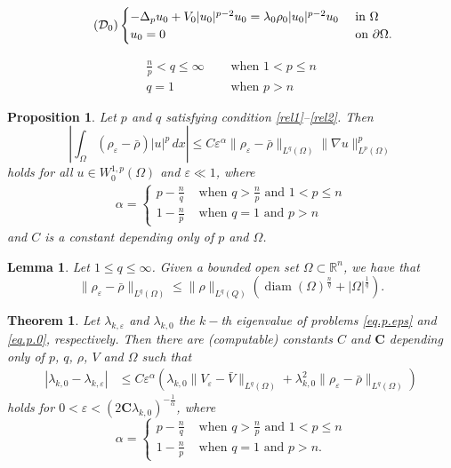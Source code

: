 \documentclass[10pt,a4paper]{amsart}
\newtheorem{prop}{Proposition}
\newtheorem{lema}{Lemma}
\newtheorem{thm}{Theorem}
\begin{document}
\begin{align}\tag{$\mathcal{D}_0$}   \label{eq.p.0} 
\begin{cases}
-\Delta_p u_0 +  V_0 |u_0|^{p-2}u_0 = \lambda_0 \rho_0 |u_0|^{p-2}u_0 &\text{ in } \Omega\\
u_0=0 & \text{ on } \partial\Omega.
\end{cases}
\end{align}

\begin{align} 
\frac{n}{p} < q\leq \infty &\quad \text{ when }1<p\leq n  \label{rel1}\\
q=1 &\quad \text{ when } p>n \label{rel2}
\end{align}

\begin{prop} \label{prop.dirichlet}
Let $p$ and $q$ satisfying condition \eqref{rel1}--\eqref{rel2}. Then
$$
\left|\int_\Omega(\rho_\varepsilon-\bar\rho) |u|^p\,dx \right|  \leq   C \varepsilon^\alpha \|\rho_\varepsilon - \bar \rho\|_{L^q(\Omega)}   \|\nabla u\|_{L^p(\Omega)}^p
$$
holds for all $u\in W^{1,p}_0(\Omega)$ and $\varepsilon\ll 1$, where 
\begin{align} \label{alfa}
\alpha=
\begin{cases}
p-\frac{n}{q} & \text{ when } q> \frac{n}{p} \text{ and } 1<p\leq n\\
1-\frac{n}{p} & \text{ when } q= 1 \text{ and } p>n
\end{cases}
\end{align}
and $C$ is a constant depending only of $p$  and $\Omega$.
\end{prop}

\begin{lema} \label{cota.rho}
Let $1\leq q\leq \infty$. Given a bounded open set $\Omega\subset \mathbb R^n$,  we have that
$$
\|\rho_\varepsilon - \bar \rho\|_{L^q(\Omega)} \leq 
\|\rho\|_{L^q(Q)}\left( \mathop{diam}(\Omega)^\frac{n}{q} + |\Omega|^\frac1q \right).
$$
\end{lema}

\begin{thm} \label{teo.d}
  Let $\lambda_{k,\varepsilon}$ and $\lambda_{k,0}$ the $k-$th eigenvalue of problems \eqref{eq.p.eps} and \eqref{eq.p.0}, respectively. Then there are (computable) constants $C$ and $\textbf{C}$ depending only of $p$, $q$, $\rho$, $V$ and $\Omega$ such that
\begin{align*}
|\lambda_{k,0}-\lambda_{k,\varepsilon}| &\leq  
C  \varepsilon^\alpha \left(\lambda_{k,0} \|V_\varepsilon - \bar V\|_{L^q(\Omega)}  +  \lambda_{k,0}^2 \|\rho_\varepsilon - \bar \rho\|_{L^q(\Omega)}  \right)
\end{align*}
holds for $0<\varepsilon<(2\textbf{C} \lambda_{k,0})^{-\frac{1}{\alpha}}$, where
$$
\alpha=
\begin{cases}
p-\frac{n}{q} & \text{ when } q> \frac{n}{p} \text{ and } 1<p\leq n\\
1-\frac{n}{p} & \text{ when } q=1 \text{ and } p>n.
\end{cases}
$$
\end{thm}
\end{document}
